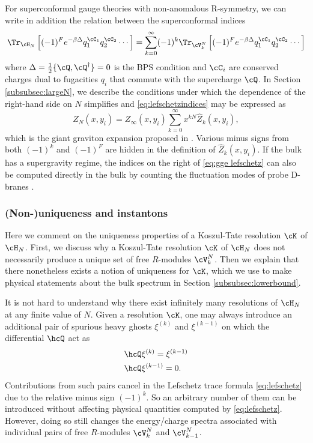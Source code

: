\documentclass[a4paper,12pt]{article}
\begin{document}
For superconformal gauge theories with non-anomalous R-symmetry, we can write in addition the relation between the superconformal indices
\begin{equation} \label{eq:lefschetzindices}
\Tr_{\cH_N} \left[ (-1)^F e^{-\beta \Delta} q_1^{\cC_1} q_2^{\cC_2} \cdots \right] = \sum_{k=0}^\infty (-1)^k \Tr_{\cV_k^N} \left[ (-1)^F e^{-\beta \Delta} q_1^{\cC_1} q_2^{\cC_2} \cdots \right]
\end{equation}
where $\Delta = \frac{1}{2} \{ \cQ, \cQ^\dag \} = 0$ is the BPS condition and $\cC_i$ are conserved charges dual to fugacities $q_i$ that commute with the supercharge $\cQ$. In Section \ref{subsubsec:largeN}, we describe the conditions under which the dependence of the right-hand side on $N$ simplifies and \eqref{eq:lefschetzindices} may be expressed as
\begin{equation} \label{eq:gge lefschetz}
Z_N(x, y_i) = Z_\infty(x, y_i) \sum_{k=0}^\infty x^{k N} \hat{Z}_k(x,y_i),
\end{equation}
which is the giant graviton expansion proposed in \cite{Gaiotto:2021xce}. Various minus signs from both $(-1)^k$ and $(-1)^F$ are hidden in the definition of $\hat{Z}_k(x,y_i)$. If the bulk has a supergravity regime, the indices on the right of \eqref{eq:gge lefschetz} can also be computed directly in the bulk by counting the fluctuation modes of probe D-branes \cite{Arai:2019xmp,Imamura:2021ytr}.


\subsubsection{(Non-)uniqueness and instantons} \label{subsubsec:instantons}

Here we comment on the uniqueness properties of a Koszul-Tate resolution $\cK$ of $\cH_N$. First, we discuss why a Koszul-Tate resolution $\cK$ of $\cH_N$ does not necessarily produce a unique set of free $R$-modules $\cV_k^{N}$. Then we explain that there nonetheless exists a notion of uniqueness for $\cK$, which we use to make physical statements about the bulk spectrum in Section \ref{subsubsec:lowerbound}.

It is not hard to understand why there exist infinitely many resolutions of $\cH_N$ at any finite value of $N$. Given a resolution $\cK$, one may always introduce an additional pair of spurious heavy ghosts $\xi^{(k)}$ and $\xi^{(k-1)}$ on which the differential $\hcQ$ act as
\begin{align} \label{eq:spurious ghosts}
    &\hcQ \xi^{(k)} = \xi^{(k-1)} \nonumber \\
    &\hcQ \xi^{(k-1)} = 0.
\end{align}
Contributions from such pairs cancel in the Lefschetz trace formula \eqref{eq:lefschetz} due to the relative minus sign $(-1)^k$. So an arbitrary number of them can be introduced without affecting physical quantities computed by \eqref{eq:lefschetz}. However, doing so still changes the energy/charge spectra associated with individual pairs of free $R$-modules $\cV_k^{N}$ and $\cV_{k-1}^{N}$.
\end{document}
